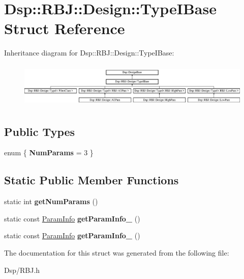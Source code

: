 \hypertarget{structDsp_1_1RBJ_1_1Design_1_1TypeIBase}{\section{Dsp\-:\-:R\-B\-J\-:\-:Design\-:\-:Type\-I\-Base Struct Reference}
\label{structDsp_1_1RBJ_1_1Design_1_1TypeIBase}
}
Inheritance diagram for Dsp\-:\-:R\-B\-J\-:\-:Design\-:\-:Type\-I\-Base\-:\begin{figure}[H]
\begin{center}
\leavevmode
\includegraphics[height=2.162162cm]{structDsp_1_1RBJ_1_1Design_1_1TypeIBase}
\end{center}
\end{figure}
\subsection*{Public Types}
\begin{DoxyCompactItemize}
\item 
enum \{ {\bfseries Num\-Params} =  3
 \}
\end{DoxyCompactItemize}
\subsection*{Static Public Member Functions}
\begin{DoxyCompactItemize}
\item 
\hypertarget{structDsp_1_1RBJ_1_1Design_1_1TypeIBase_ab6cecc67e8a94d330ee969eadbd41c5e}{static int {\bfseries get\-Num\-Params} ()}\label{structDsp_1_1RBJ_1_1Design_1_1TypeIBase_ab6cecc67e8a94d330ee969eadbd41c5e}

\item 
\hypertarget{structDsp_1_1RBJ_1_1Design_1_1TypeIBase_a4d1a90711ad4d2ae88e81afdc47f8da3}{static const \hyperlink{classDsp_1_1ParamInfo}{Param\-Info} {\bfseries get\-Param\-Info\-\_} ()}\label{structDsp_1_1RBJ_1_1Design_1_1TypeIBase_a4d1a90711ad4d2ae88e81afdc47f8da3}

\item 
\hypertarget{structDsp_1_1RBJ_1_1Design_1_1TypeIBase_a1d9ef121b2d469254313942998e6dc19}{static const \hyperlink{classDsp_1_1ParamInfo}{Param\-Info} {\bfseries get\-Param\-Info\-\_} ()}\label{structDsp_1_1RBJ_1_1Design_1_1TypeIBase_a1d9ef121b2d469254313942998e6dc19}

\end{DoxyCompactItemize}


The documentation for this struct was generated from the following file\-:\begin{DoxyCompactItemize}
\item 
Dsp/R\-B\-J.\-h\end{DoxyCompactItemize}
